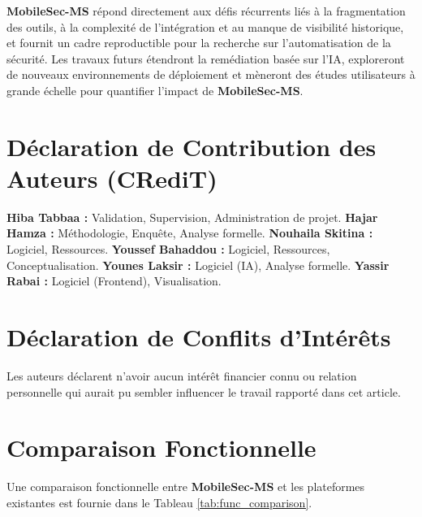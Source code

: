 \documentclass[
  journal=largetwo,
  manuscript=article-type,
  year=2025,
  volume=1,
]{cup-journal}
\begin{document}
\textbf{MobileSec-MS} répond directement aux défis récurrents liés à la fragmentation des outils, à la complexité de l'intégration et au manque de visibilité historique, et fournit un cadre reproductible pour la recherche sur l'automatisation de la sécurité. Les travaux futurs étendront la remédiation basée sur l'IA, exploreront de nouveaux environnements de déploiement et mèneront des études utilisateurs à grande échelle pour quantifier l'impact de \textbf{MobileSec-MS}.

\section*{Déclaration de Contribution des Auteurs (CRediT)}
\textbf{Hiba Tabbaa :} Validation, Supervision, Administration de projet.
\textbf{Hajar Hamza :} Méthodologie, Enquête, Analyse formelle.
\textbf{Nouhaila Skitina :} Logiciel, Ressources.
\textbf{Youssef Bahaddou :} Logiciel, Ressources, Conceptualisation.
\textbf{Younes Laksir :} Logiciel (IA), Analyse formelle.
\textbf{Yassir Rabai :} Logiciel (Frontend), Visualisation.

\section*{Déclaration de Conflits d'Intérêts}
Les auteurs déclarent n'avoir aucun intérêt financier connu ou relation personnelle qui aurait pu sembler influencer le travail rapporté dans cet article.

\appendix
\section{Comparaison Fonctionnelle}
\label{app:comparison}

Une comparaison fonctionnelle entre \textbf{MobileSec-MS} et les plateformes existantes est fournie dans le Tableau \ref{tab:func_comparison}.
\end{document}
